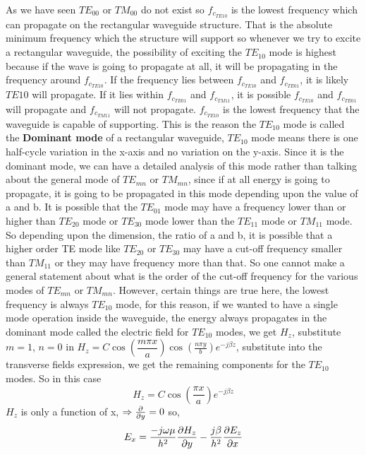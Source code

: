 As we have seen $TE_{00}$ or $TM_{00}$ do not exist so $f_{c_{TE{10}}}$ is the lowest frequency which can propagate on the rectangular waveguide structure. That is the absolute minimum frequency which the structure will support so whenever we try to excite a rectangular waveguide, the possibility of exciting the $TE_{10}$ mode is highest because if the wave is going to propagate at all, it will be propagating in the frequency around $f_{c_{TE{10}}}$. If the frequency lies between $f_{c_{TE{10}}}$ and $f_{c_{TE{01}}}$, it is likely $TE{10}$ will propagate. If it lies within $f_{c_{TE{01}}}$ and $f_{c_{TM{11}}}$, it is possible  $f_{c_{TE{10}}}$ and $f_{c_{TE{01}}}$ will propagate and $f_{c_{TM{11}}}$ will not propagate. $f_{c_{TE{10}}}$ is the lowest frequency that the waveguide is capable of supporting. This is the reason the $TE_{10}$ mode is called the \textbf{Dominant mode} of a rectangular waveguide, $TE_{10}$ mode means there is one half-cycle variation in the x-axis and no variation on the y-axis. Since it is the dominant mode, we can have a detailed analysis of this mode rather than talking about the general mode of $TE_{mn}$ or $TM_{mn}$, since if at all energy is going to propagate, it is going to be propagated in this mode depending upon the value of a and b. It is possible that the $TE_{01}$ mode may have a frequency lower than or higher than $TE_{20}$ mode or $TE_{30}$ mode lower than the $TE_{11}$ mode or $TM_{11}$ mode. So depending upon the dimension, the ratio of a and b, it is possible that a higher order TE mode like $TE_{20}$ or $TE_{30}$ may have a cut-off frequency smaller than $TM_{11}$ or they may have frequency more than that. So one cannot make a general statement about what is the order of the cut-off frequency for the various modes of $TE_{mn}$ or $TM_{mn}$. However, certain things are true here, the lowest frequency is always $TE_{10}$ mode, for this reason, if we wanted to have a single mode operation inside the waveguide, the energy always propagates in the dominant mode called the electric field for $TE_{10}$ modes, we get $H_z$, substitute $m=1$, $n=0$ in $H_z = C \cos(\dfrac{m\pi x}{a})\cos(\frac{n\pi y}{b})e^{-j\beta z}$, substitute into the transverse fields expression, we get the remaining components for the $TE_{10}$ modes. So in this case
\begin{dmath*}
H_z = C\cos(\frac{\pi x}{a})e^{-j\beta z}
\end{dmath*}
$H_z$ is only a function of x, $\Rightarrow \pdv{}{y} = 0$ so,
\begin{dmath*}
E_x = \frac{-j\omega\mu}{h^2}\pdv{H_z}{y} - \frac{j\beta}{h^2}\pdv{E_z}{x}
\end{dmath*}
